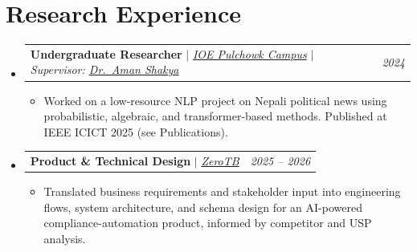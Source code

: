 \documentclass[letterpaper,11pt]{article}
\makeatletter
\newcommand{\resumeItem}[1]{
  \item\small{
    {#1 \vspace{-2pt}}
  }
}
\newcommand{\resumeOneLine}[3]{
  \vspace{-1pt}\item
    \begin{tabular*}{0.97\textwidth}[t]{l@{\extracolsep{\fill}}r}
      \textbf{#1} $|$ \textit{\small#2} & \textit{\small#3} \\
    \end{tabular*}\vspace{-1pt}
}
\newcommand{\resumeSubHeadingListStart}{\begin{itemize}[leftmargin=0.15in, label={}, itemsep=4pt, parsep=0pt, topsep=2pt]}
\newcommand{\resumeSubHeadingListEnd}{\end{itemize}}
\newcommand{\resumeItemListStart}{\begin{itemize}[leftmargin=0.15in, itemsep=2pt, parsep=0pt, topsep=2pt]}
\newcommand{\resumeItemListEnd}{\end{itemize}\vspace{-4pt}}
\makeatother
\begin{document}
\section{Research Experience}
\resumeSubHeadingListStart
\resumeOneLine
{Undergraduate Researcher}{\href{https://pcampus.edu.np/}{IOE Pulchowk Campus} $|$ Supervisor: \href{https://www.amanshakya.com.np/}{Dr.\ Aman Shakya}}{2024}
\resumeItemListStart
    \resumeItem{Worked on a low-resource NLP project on Nepali political news using probabilistic, algebraic, and transformer-based methods. Published at IEEE ICICT 2025 (see Publications).}
\resumeItemListEnd
\resumeOneLine
{Product \& Technical Design}{\href{https://zerotb.ai}{ZeroTB}}{2025 -- 2026}
\resumeItemListStart
    \resumeItem{Translated business requirements and stakeholder input into engineering flows, system architecture, and schema design for an AI-powered compliance-automation product, informed by competitor and USP analysis.}
\resumeItemListEnd
\resumeSubHeadingListEnd

\end{document}
